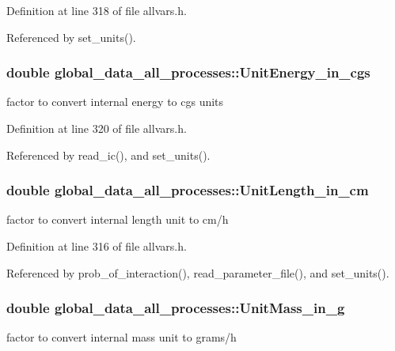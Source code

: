 Definition at line 318 of file allvars.h.



Referenced by set\_\-units().

\hypertarget{structglobal__data__all__processes_ab0d48e2253ad31d76eda8e677eba2cf1}{
\subsubsection[{UnitEnergy\_\-in\_\-cgs}]{\setlength{\rightskip}{0pt plus 5cm}double {\bf global\_\-data\_\-all\_\-processes::UnitEnergy\_\-in\_\-cgs}}}
\label{structglobal__data__all__processes_ab0d48e2253ad31d76eda8e677eba2cf1}
factor to convert internal energy to cgs units 

Definition at line 320 of file allvars.h.



Referenced by read\_\-ic(), and set\_\-units().

\hypertarget{structglobal__data__all__processes_a111a45896aafd67faa8f0c9ef897612f}{
\subsubsection[{UnitLength\_\-in\_\-cm}]{\setlength{\rightskip}{0pt plus 5cm}double {\bf global\_\-data\_\-all\_\-processes::UnitLength\_\-in\_\-cm}}}
\label{structglobal__data__all__processes_a111a45896aafd67faa8f0c9ef897612f}
factor to convert internal length unit to cm/h 

Definition at line 316 of file allvars.h.



Referenced by prob\_\-of\_\-interaction(), read\_\-parameter\_\-file(), and set\_\-units().

\hypertarget{structglobal__data__all__processes_adccf5aa82d4252d8d24ead7681b29052}{
\subsubsection[{UnitMass\_\-in\_\-g}]{\setlength{\rightskip}{0pt plus 5cm}double {\bf global\_\-data\_\-all\_\-processes::UnitMass\_\-in\_\-g}}}
\label{structglobal__data__all__processes_adccf5aa82d4252d8d24ead7681b29052}
factor to convert internal mass unit to grams/h 

